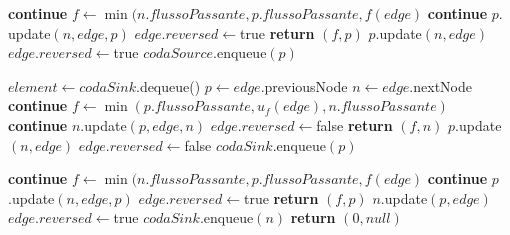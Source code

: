 \documentclass{article}
\begin{document}
\begin{algorithm}
    \begin{algorithmic}[1]
        \STATE \textbf{continue}
        \ELSE
        \STATE $f \leftarrow \min(n.flussoPassante,p.flussoPassante,f(edge)$
        \STATE \textbf{continue}
        \ENDIF
        \STATE $p.$update$(n,edge,p)$
        \STATE $edge.reversed \leftarrow $true
        \STATE \textbf{return} $(f,p)$
        \ENDIF
        \ENDIF
        \STATE $p.$update$(n,edge)$
        \STATE $edge.reversed \leftarrow $true
        \STATE $codaSource.$enqueue$(p)$
        \ENDIF

        \ENDFOR
        \ENDIF

        \STATE $element \leftarrow codaSink.$dequeue()
        \STATE $p \leftarrow edge$.previousNode
        \STATE $n \leftarrow edge.$nextNode
        \STATE \textbf{continue}
        \ELSE
        \STATE $f \leftarrow \min(p.flussoPassante,u_f(edge),n.flussoPassante)$
        \STATE \textbf{continue}
        \ENDIF
        \STATE $n.$update$(p,edge,n)$
        \STATE $edge.reversed \leftarrow $false
        \STATE \textbf{return} $(f,n)$
        \ENDIF
        \ENDIF
        \STATE $p.$update$(n,edge)$
        \STATE $edge.reversed \leftarrow $false
        \STATE $codaSink.$enqueue$(p)$
        \ENDIF
    \end{algorithmic}
\end{algorithm}
\newpage
\begin{algorithm}
    \begin{algorithmic}[1]
        \STATE \textbf{continue}
        \ELSE
        \STATE $f \leftarrow \min(n.flussoPassante,p.flussoPassante,f(edge)$
        \STATE \textbf{continue}
        \ENDIF
        \STATE $p$.update$(n,edge,p)$
        \STATE $edge.reversed \leftarrow $true
        \STATE \textbf{return} $(f,p)$
        \ENDIF
        \ENDIF
        \STATE $n.$update$(p,edge)$
        \STATE $edge.reversed \leftarrow $true
        \STATE $codaSink.$enqueue$(n)$
        \ENDIF
        \ENDFOR
        \ENDIF
        \ENDWHILE
        \STATE \textbf{return} $(0,null)$
    \end{algorithmic}
\end{algorithm}
\end{document}
